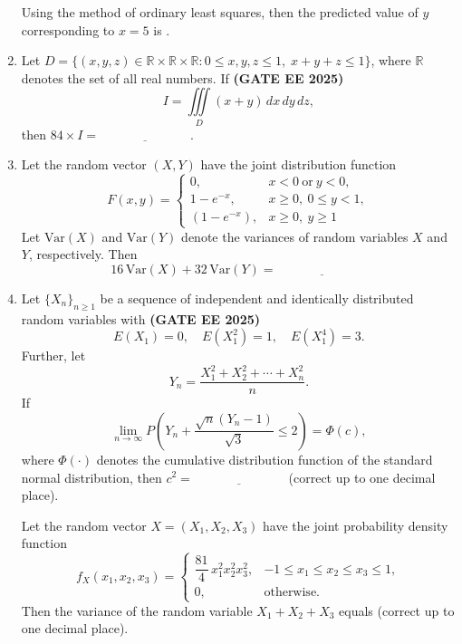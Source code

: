 \documentclass[journal,12pt,onecolumn]{IEEEtran}
\theoremstyle{remark}
\begin{document}
\begin{enumerate}
Using the method of ordinary least squares, then the predicted value of $y$ corresponding to $x=5$ is 
\underline{\hspace{3cm}}. 

\item Let $D = \{(x,y,z) \in \mathbb{R}\times\mathbb{R}\times\mathbb{R} : 0 \leq x,y,z \leq 1, \; x+y+z \leq 1\}$, where $\mathbb{R}$ denotes the set of all real numbers. If \hfill \textbf{(GATE EE 2025)}
\[
I = \iiint\limits_{D} (x+y)\,dx\,dy\,dz,
\]
then $84 \times I = \underline{\hspace{3cm}}$.


\item Let the random vector $(X,Y)$ have the joint distribution function
\[
F(x,y) = \begin{cases}
0, & x<0 \ \text{or}\ y<0, \\
1 - e^{-x}, & x \geq 0, \ 0 \leq y < 1, \\
(1 - e^{-x}), & x \geq 0, \ y \geq 1
\end{cases}
\]
Let $\text{Var}(X)$ and $\text{Var}(Y)$ denote the variances of random variables $X$ and $Y$, respectively. Then
\[
16 \, \text{Var}(X) + 32 \, \text{Var}(Y) = \underline{\hspace{3cm}}
\]

\item Let $\{X_n\}_{n \geq 1}$ be a sequence of independent and identically distributed random variables with \hfill \textbf{(GATE EE 2025)}
\[
E(X_1) = 0, \quad E(X_1^2) = 1, \quad E(X_1^4) = 3.
\] 
Further, let 
\[
Y_n = \frac{X_1^2 + X_2^2 + \cdots + X_n^2}{n}.
\]
If 
\[
\lim_{n \to \infty} P\left( Y_n + \frac{\sqrt{n}(Y_n - 1)}{\sqrt{3}} \leq 2 \right) = \Phi(c),
\]
where $\Phi(\cdot)$ denotes the cumulative distribution function of the standard normal distribution, then $c^2 = \underline{\hspace{3cm}}$ (correct up to one decimal place).


Let the random vector $X = (X_1, X_2, X_3)$ have the joint probability density function 
\[
f_{X}(x_1, x_2, x_3) = \begin{cases}
\dfrac{81}{4} \, x_1^2 x_2^2 x_3^2, & -1 \leq x_1 \leq x_2 \leq x_3 \leq 1, \\
0, & \text{otherwise}.
\end{cases}
\]
Then the variance of the random variable $X_1 + X_2 + X_3$ equals \underline{\hspace{3cm}} (correct up to one decimal place).



\end{enumerate}
\end{document}

